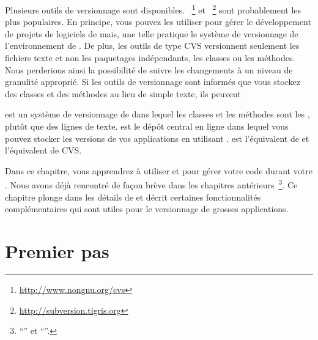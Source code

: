 \documentclass[a4paper,10pt,twoside]{book}
\begin{document}
Plusieurs outils de versionnage sont
disponibles. ~\footnote{\url{http://www.nongnu.org/cvs}} et
~\footnote{\url{http://subversion.tigris.org}} sont
probablement les plus populaires.
En principe, vous pouvez les utiliser pour g\'erer le d\'eveloppement
de projets de logiciels de \pharo mais, une telle pratique
 le système de versionnage de l'environnement
de \pharo. %
De plus, les outils de type CVS versionnent seulement les fichiers
texte et non les paquetages indépendants, les classes ou les
méthodes. Nous perderions ainsi la possibilité de suivre les
changements à un niveau de granulité approprié.
Si les outils de versionnage sont informés que vous stockez des
classes et des méthodes au lieu de simple texte, ils peuvent 


\emph{\indmain{\MC{}}} est un système de versionnage de \pharo
dans lequel les classes et les méthodes sont les , plutôt que des lignes de texte.
 \emph{\sqsrc{}} est le dépôt central en ligne dans lequel vous pouvez
 stocker les versions de vos applications en utilisant \MC. \sqsrc est
 l'équivalent de  et \MC l'équivalent de CVS.

Dans ce chapitre, vous apprendrez \`a utiliser \MC et
\sqsrc pour g\'erer votre code durant votre . %
Nous avons déjà rencontré de façon brève \MC dans les chapitres
antérieurs~\footnote{``\titreFirstapp'' et  ``\titreEnvironment''.}.
Ce chapitre plonge dans les détails de 
 \MC{} et décrit certaines fonctionnalités complémentaires qui sont
 utiles pour le versionnage de grosses applications.

\section{Premier pas} %
\end{document}
